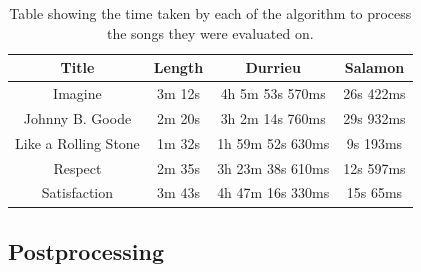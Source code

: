 \begin{table}
\begin{center}
\begin{tabular} {| c | c | c | c |} \hline
Title 							& Length 		& Durrieu  						& Salamon  	\\ \hline \hline
Imagine						& 3m 12s		&	4h 5m 53s 570ms 		& 26s 422ms		\\	\hline
Johnny B. Goode		& 2m 20s		&	3h 2m 14s 760ms		& 29s 932ms		\\ 	\hline
Like a Rolling Stone	& 1m 32s		&	1h 59m 52s 630ms		& 9s 193ms		\\ 	\hline
Respect						& 2m 35s		&	3h 23m 38s 610ms		& 12s 597ms		\\ 	\hline
Satisfaction				& 3m 43s		& 	4h 47m 16s 330ms		& 15s 65ms		\\	\hline
\end{tabular}
\caption{Table showing the time taken by each of the algorithm to process the songs they were evaluated on.}
\label{table:melodytiming}
\end{center}
\end{table}

\vspace{10pt}


\subsection{Postprocessing}

